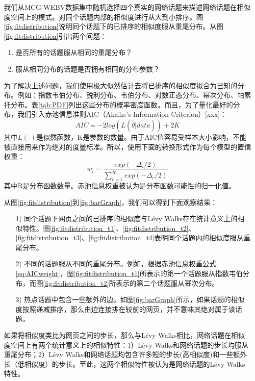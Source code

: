 我们从MCG-WEBV数据集中随机选择四个真实的网络话题来描述网络话题在相似度空间上的模式。对同个话题内部的相似度进行从大到小排序。图\ref{fig:fitdistribution}说明同个话题下的已排序的相似度服从重尾分布。从图\ref{fig:fitdistribution}引出两个问题：
\begin{enumerate}
\renewcommand{\labelenumi}{\theenumi)}
    \item 是否所有的话题服从相同的重尾分布？
    \item 服从相同分布的话题是否拥有相同的分布参数？ 
\end{enumerate}

为了解决上述问题，我们使用极大似然估计去将已排序的相似度拟合为已知的分布。例如：指数韦伯分布、锐利分布、韦伯分布、对数正态分布、幂次分布、帕累托分布。表\ref{tab:PDF}列出这些分布的概率密度函数。而且，为了量化最好的分布，我们引入赤池信息准则AIC（Akaike’s Information Criterion）[xxx]：
\begin{equation}\label{eq:AIC}
 AIC = -2log(L(\hat{\theta}|data)) + 2K   
\end{equation}
其中$L(\cdot)$是似然函数，K是参数的数量。由于AIC值容易受样本大小影响，不能被直接用来作为绝对的度量标准。所以，使用下面的转换形式作为每个模型的置信权重：
\begin{equation}\label{eq:AICweight}
    w_i = \frac{exp(-\Delta_i/2)}{\sum_{r=1}^{R}exp(-\Delta_r/2)}
\end{equation}
其中R是分布函数数量。赤池信息权重被认为是分布函数可能性的归一化值。

从图\ref{fig:fitdistribution}到\ref{fig:barGraph}，我们可以得到下面观察结果：
\begin{enumerate}
    \item[1)] 同个话题下网页之间的已排序的相似度与L\'{e}vy Walks存在统计意义上的相似特性。图\ref{fig:fitdistribution_t1}、\ref{fig:fitdistribution_t2}、\ref{fig:fitdistribution_t3}、\ref{fig:fitdistribution_t4}表明同个话题内的相似度服从重尾分布。
    \item[2)] 不同的话题服从不同的重尾分布。例如，根据赤池信息权重公式\ref{eq:AICweight}，图\ref{fig:fitdistribution_t1}所表示的第一个话题服从指数韦伯分布，而图\ref{fig:fitdistribution_t2}所表示的第二个话题服从幂次分布。
    \item[3)] 热点话题中包含一些额外的边。如图\ref{fig:barGraph}所示，如果话题的相似度按照递减排序，那么由边连接排在较前的网页，并不意味其绝对属于该话题。
\end{enumerate}

如果将相似度类比为网页之间的步长，那么与L\'{e}vy Walks相比，网络话题在相似度空间上有两个统计意义上的相似特性：1）L\'{e}vy Walks和网络话题的步长均服从重尾分布；2）L\'{e}vy Walks和网络话题均包含许多短的步长(高相似度)和一些额外长（低相似度）的步长。至此，这两个相似特性被认为是网络话题的L\'{e}vy Walks特性。


